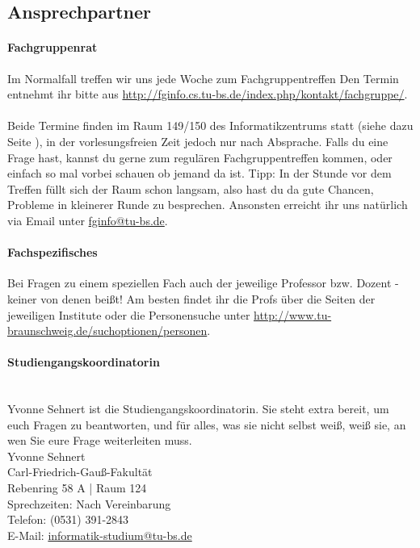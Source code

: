 
\subsection{Ansprechpartner}
\paragraph{Fachgruppenrat}

Im Normalfall treffen wir uns jede Woche zum Fachgruppentreffen
Den  Termin entnehmt ihr bitte aus
\url{http://fginfo.cs.tu-bs.de/index.php/kontakt/fachgruppe/}.
\\\\
Beide Termine finden im Raum 149/150 des Informatikzentrums statt
(siehe dazu Seite \pageref{campuskarte}), in der vorlesungsfreien Zeit
jedoch nur nach Absprache. 
  Falls du eine Frage hast, kannst du gerne zum regulären
  Fachgruppentreffen kommen, oder einfach so mal vorbei schauen ob
  jemand da ist. Tipp: In der Stunde vor dem Treffen füllt sich der
  Raum schon langsam, also hast du da gute Chancen, Probleme in
  kleinerer Runde zu besprechen. 
 Ansonsten erreicht ihr uns natürlich via
Email unter \url{fginfo@tu-bs.de}.

\paragraph{Fachspezifisches}
Bei Fragen zu einem speziellen Fach auch der jeweilige Professor
bzw. Dozent - keiner von denen beißt! Am besten findet ihr die Profs
über die Seiten der jeweiligen Institute oder die Personensuche unter
\url{http://www.tu-braunschweig.de/suchoptionen/personen}.
\paragraph{\small Studiengangskoordinatorin} \ \\ Yvonne Sehnert ist die Studiengangskoordinatorin. Sie steht extra bereit,
um euch Fragen zu beantworten, und für alles, was sie nicht selbst
weiß, weiß sie, an wen Sie eure Frage weiterleiten muss.\\
{
Yvonne Sehnert\\
Carl-Friedrich-Gauß-Fakultät\\
Rebenring 58 A | Raum 124\\
Sprechzeiten: Nach  Vereinbarung\\
Telefon: (0531) 391-2843\\
E-Mail: \url{informatik-studium@tu-bs.de}
}

